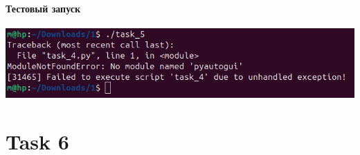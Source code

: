     \paragraph{Тестовый запуск}
    \includegraphics[width=1\linewidth]{static/_task_5.png}


    \section*{Task 6}

